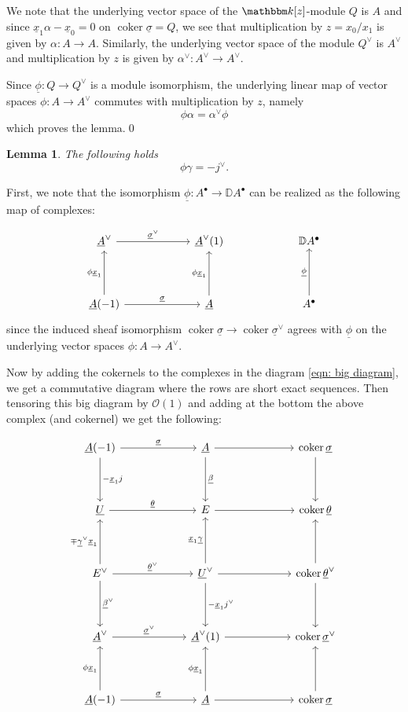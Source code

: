 \message{ !name(Bryan-Vakil.tex)}\documentclass{amsart}
\newtheorem{lemma}[theorem]{Lemma}
\theoremstyle{definition}
\newcommand{\DD} {{\mathbb D}}
\newcommand{\kk} {{\mathbbm k}}
\newcommand{\OO}{\mathcal{O}}
\newcommand{\coker}{\operatorname{coker}}
\newcommand{\UL}[1]{\underline{#1}}
\begin{document}
We note that the underlying vector space of the $\kk [z]$-module $Q$ is
$A$ and since $\UL{x}_{1}\alpha -\UL{x}_{0}=0$ on $\coker
\UL{\sigma}=Q$, we see that multiplication by $z=x_{0}/x_{1}$ is given
by $\alpha :A\to A$. Similarly, the underlying vector space of the
module $Q^{\vee}$ is $A^{\vee}$ and multiplication by $z$ is given by
$\alpha^{\vee}:A^{\vee}\to A^{\vee}$.

Since $\UL{\phi}:Q\to Q^{\vee}$ is a module isomorphism, the
underlying linear map of vector spaces $\phi :A\to A^{\vee}$ commutes
with multiplication by $z$, namely
\[
\phi \alpha =\alpha^{\vee}\phi 
\]
which proves the lemma.\qed 

\begin{lemma}\label{lem: phi.gamma = -jvee}
The following holds
\[
\phi \gamma =-j^{\vee}.
\]
\end{lemma}
\proof
First, we note that the isomorphism $\UL{\phi}:A^{\bullet}\to \DD
A^{\bullet}$ can be realized as the following map of complexes:

\[
\begin{tikzcd}[column sep=6em,row sep=4em]
  \UL{A}^{\vee }
    \arrow[r,"\UL{\sigma}^{\vee}"]
  & \UL{A}^{\vee}(1)
  & \DD A^{\bullet }
  \\
  \UL{A}(-1)
    \arrow[r,"\UL{\sigma  }"]
    \arrow[u,"\phi \UL{x}_{1}"]
  & \UL{A}
    \arrow[u,"\phi \UL{x}_{1}"]
  & A^{\bullet}
    \arrow[u,"\UL{\phi } "]
\end{tikzcd}
\]
since the induced sheaf isomorphism $\coker \UL{\sigma}\to \coker
\UL{\sigma}^{\vee}$ agrees with $\UL{\phi}$ on the underlying vector
spaces $\phi :A\to A^{\vee}$.

Now by adding the cokernels to the complexes in the diagram
\eqref{eqn: big diagram}, we get a commutative diagram where the rows
are short exact sequences. Then tensoring this big diagram by $\OO
(1)$ and adding at the bottom the above complex (and cokernel) we get the
following:

\begin{equation*}
\begin{tikzcd}[column sep=6em,row sep=4em]
  \UL{A}(-1)
    \arrow[d,"-\UL{x}_{1}j"]
    \arrow[r,"\UL{\sigma  }"]
  & \UL{A}
    \arrow[d,"\UL{\beta }"]
    \arrow[r]
  & \coker \UL{\sigma }
    \arrow[d]
  \\
  \UL{U}
    \arrow[r,"\UL{\theta }"]
  & E
    \arrow[r]
  & \coker \UL{\theta }
  \\
  E^{\vee}
    \arrow[d,"\UL{\beta}^{\vee}"]
    \arrow[u,"\mp \UL{\gamma}^{\vee}\UL{x}_{1}"]
    \arrow[r,"\UL{\theta }^{\vee}"]
  & \UL{U}^{\vee }
    \arrow[r]
    \arrow[d,"-\UL{x}_{1}j^{\vee}"]
    \arrow[u,"\UL{x}_{1}\UL{\gamma }"]
  & \coker \UL{\theta}^{\vee}
    \arrow[d]
    \arrow[u]
  \\
    \UL{A}^{\vee} 
    \arrow[r,"\UL{\sigma  }^{\vee}"]
  & \UL{A}^{\vee}(1)
    \arrow[r]
  & \coker \UL{\sigma}^{\vee}
  \\
  \UL{A}(-1)
    \arrow[u,"\phi \UL{x}_{1}"]
    \arrow[r,"\UL{\sigma  }"]
  & \UL{A}
    \arrow[u,"\phi \UL{x}_{1}"]
    \arrow[r]
  & \coker \UL{\sigma }
    \arrow[u]    
\end{tikzcd}
\end{equation*}
\end{document}
